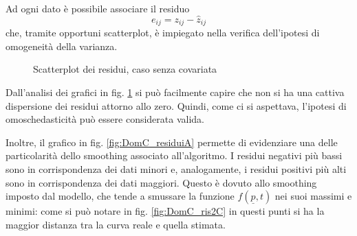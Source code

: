 \documentclass[a4paper,11pt,twoside,openright]{book}							%
\begin{document}
Ad ogni dato è possibile associare il residuo
$$
e_{ij}=z_{ij}-\hat{z}_{ij}
$$
che, tramite opportuni scatterplot, è impiegato nella verifica dell'ipotesi di omogeneità della varianza.
\newpage
\begin{figure}[t]
	\centering
	\caption{Scatterplot dei residui, caso senza covariata}
	\label{fig:DomC_residui}
\end{figure}
Dall'analisi dei grafici in fig. \ref{fig:DomC_residui} si può facilmente capire che non si ha una cattiva dispersione dei residui attorno allo zero. Quindi, come ci si aspettava, l'ipotesi di omoschedasticità può essere considerata valida.

Inoltre, il grafico in fig. \ref{fig:DomC_residuiA} permette di evidenziare una delle particolarità dello smoothing associato all'algoritmo. I residui negativi più bassi sono in corrispondenza dei dati minori e, analogamente, i residui positivi più alti sono in corrispondenza dei dati maggiori. Questo è dovuto allo smoothing imposto dal modello, che tende a smussare la funzione $f(\underline{p},t)$ nei suoi massimi e minimi: come si può notare in fig. \ref{fig:DomC_ris2C} in questi punti si ha la maggior distanza tra la curva reale e quella stimata.
\end{document}
